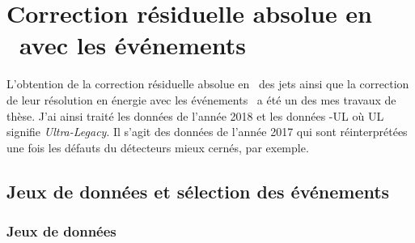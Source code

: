 \section{Correction résiduelle absolue en \pT\ avec les événements \Gjets}\label{chapter-JERC-section-JES}
L'obtention de la correction résiduelle absolue en \pT\ des jets
ainsi que la correction de leur résolution en énergie
avec les événements \Gjets\ a été un des mes travaux de thèse.
J'ai ainsi traité les données de l'année 2018 et les données -UL \fg{} où UL signifie \emph{Ultra-Legacy}.
Il s'agit des données de l'année 2017 qui sont réinterprétées une fois les défauts du détecteurs mieux cernés, par exemple.
\subsection{Jeux de données et sélection des événements}\label{chapter-JERC-section-JES-subsec-evt_select}
\subsubsection{Jeux de données}
%     
%     
%     
%
%
%     
%     
%     
%     
%
%
%     
%     
%     
%     
